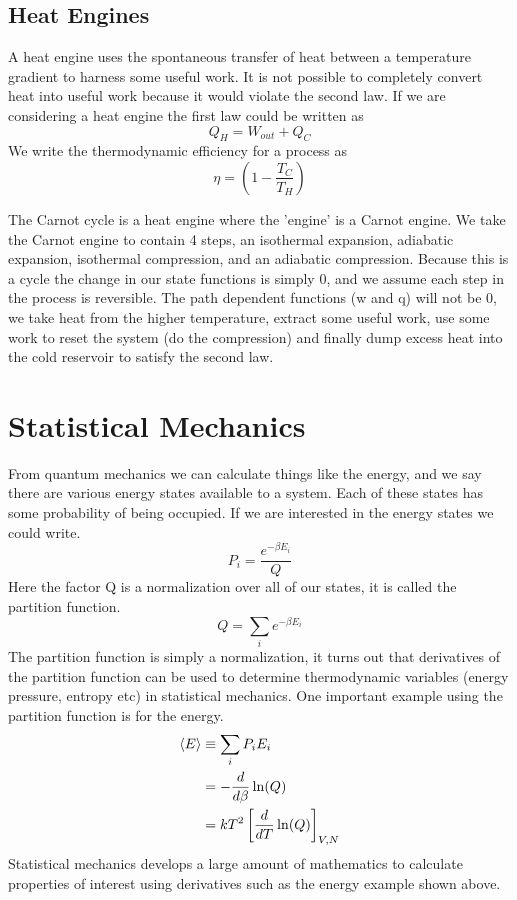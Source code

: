 \documentclass{article}
\begin{document}
 \subsection{Heat Engines}
A heat engine uses the spontaneous transfer of heat between a temperature gradient to harness some useful work. 
It is not possible to completely convert heat into useful work because it would violate the second law. 
If we are considering a heat engine the first law could be written as 
\begin{equation}
    Q_H = W_{out} + Q_C
\end{equation}
 We write the thermodynamic efficiency for a process as 
 \begin{equation}
     \eta = \left( 1 - \frac{T_C}{T_H} \right)
 \end{equation}
 
 The Carnot cycle is a heat engine where the 'engine' is a Carnot engine. 
 We take the Carnot engine to contain 4 steps, an isothermal expansion, adiabatic expansion, isothermal compression, and an adiabatic compression.
 Because this is a cycle the change in our state functions is simply 0, and we assume each step in the process is reversible. 
 The path dependent functions (w and q) will not be 0, we take heat from the higher temperature, extract some useful work, use some work to reset the system (do the compression) and finally dump excess heat into the cold reservoir to satisfy the second law. 
 
\section{Statistical Mechanics}
From quantum mechanics we can calculate things like the energy, and we say there are various energy states available to a system. 
Each of these states has some probability of being occupied.
If we are interested in the energy states we could write. 
\begin{equation}
    P_i = \frac{e^{-\beta E_i}}{Q}
\end{equation}
Here the factor Q is a normalization over all of our states, it is called the partition function. 
\begin{equation}
    Q = \sum_ie^{-\beta E_i}
\end{equation}
The partition function is simply a normalization, it turns out that derivatives of the partition function can be used to determine thermodynamic variables (energy pressure, entropy etc) in statistical mechanics. 
One important example using the partition function is for the energy. 
\begin{equation}
    \begin{split}
        \braket{E} &\equiv \sum_i P_iE_i \\
        &= -\frac{d}{d\beta}\ln(Q) \\
        &= kT^2\left[\frac{d}{dT}\ln(Q)\right]_{V,N}
    \end{split}
\end{equation}
Statistical mechanics develops a large amount of mathematics to calculate properties of interest using derivatives such as the energy example shown above. 
\end{document}
